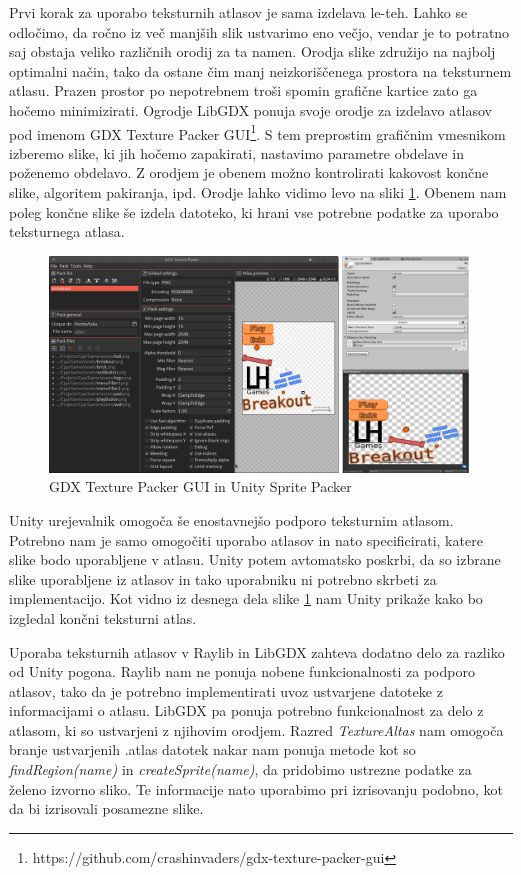 \documentclass[12pt,a4paper,twoside]{book}
\begin{document}
Prvi korak za uporabo teksturnih atlasov je sama izdelava le-teh. Lahko se odločimo, da ročno iz več manjših slik ustvarimo eno večjo, vendar je to potratno saj obstaja veliko različnih orodij za ta namen. Orodja slike združijo na najbolj optimalni način, tako da ostane čim manj neizkoriščenega prostora na teksturnem atlasu. Prazen prostor po nepotrebnem troši spomin grafične kartice zato ga hočemo minimizirati. Ogrodje LibGDX ponuja svoje orodje za izdelavo atlasov pod imenom GDX Texture Packer GUI\footnote{https://github.com/crashinvaders/gdx-texture-packer-gui}. S tem preprostim grafičnim vmesnikom izberemo slike, ki jih hočemo zapakirati, nastavimo parametre obdelave in poženemo obdelavo. Z orodjem je obenem možno kontrolirati kakovost končne slike, algoritem pakiranja, ipd. Orodje lahko vidimo levo na sliki \ref{slika:texturePacker}. Obenem nam poleg končne slike še izdela datoteko, ki hrani vse potrebne podatke za uporabo teksturnega atlasa.

\begin{figure}[h]
	\centering
	\includegraphics[width=15cm]{texturePacker}
	\caption{GDX Texture Packer GUI in Unity Sprite Packer}
	\label{slika:texturePacker}
\end{figure}

Unity urejevalnik omogoča še enostavnejšo podporo teksturnim atlasom. Potrebno nam je samo omogočiti uporabo atlasov in nato specificirati, katere slike bodo uporabljene v atlasu. Unity potem avtomatsko poskrbi, da so izbrane slike uporabljene iz atlasov in tako uporabniku ni potrebno skrbeti za implementacijo. Kot vidno iz desnega dela slike \ref{slika:texturePacker} nam Unity prikaže kako bo izgledal končni teksturni atlas.

Uporaba teksturnih atlasov v Raylib in LibGDX zahteva dodatno delo za razliko od Unity pogona. Raylib nam ne ponuja nobene funkcionalnosti za podporo atlasov, tako da je potrebno implementirati uvoz ustvarjene datoteke z informacijami o atlasu. LibGDX pa ponuja potrebno funkcionalnost za delo z atlasom, ki so ustvarjeni z njihovim orodjem. Razred \textit{TextureAltas} nam omogoča branje ustvarjenih .atlas datotek nakar nam ponuja metode kot so \textit{findRegion(name)} in \textit{createSprite(name)}, da pridobimo ustrezne podatke za želeno izvorno sliko. Te informacije nato uporabimo pri izrisovanju podobno, kot da bi izrisovali posamezne slike. 
\end{document}

